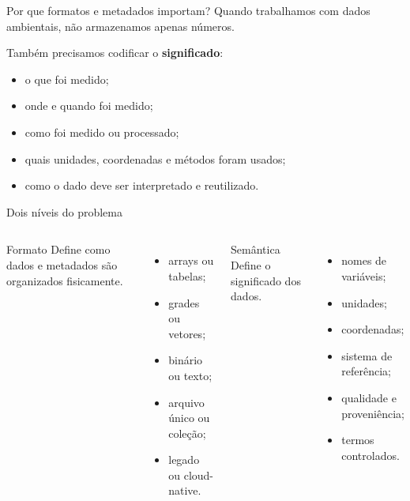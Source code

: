\documentclass[aspectratio=169]{beamer}
\begin{document}
\begin{frame}{Por que formatos e metadados importam?}
\Large
Quando trabalhamos com dados ambientais, não armazenamos apenas números.

\vspace{0.4cm}

Também precisamos codificar o \textbf{significado}:

\begin{itemize}
  \item o que foi medido;
  \item onde e quando foi medido;
  \item como foi medido ou processado;
  \item quais unidades, coordenadas e métodos foram usados;
  \item como o dado deve ser interpretado e reutilizado.
\end{itemize}
\end{frame}

\begin{frame}{Dois níveis do problema}
\begin{columns}
\begin{block}{Formato}
Define como dados e metadados são organizados fisicamente.
\end{block}

\begin{itemize}
  \item arrays ou tabelas;
  \item grades ou vetores;
  \item binário ou texto;
  \item arquivo único ou coleção;
  \item legado ou cloud-native.
\end{itemize}

\begin{block}{Semântica}
Define o significado dos dados.
\end{block}

\begin{itemize}
  \item nomes de variáveis;
  \item unidades;
  \item coordenadas;
  \item sistema de referência;
  \item qualidade e proveniência;
  \item termos controlados.
\end{itemize}
\end{columns}
\end{frame}
\end{document}
